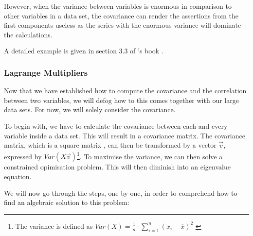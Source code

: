 However, when the variance between variables is enormous in comparison to other variables in a data set, the covariance can render the assertions from the first components useless as the series with the enormous variance will dominate the calculations.

A detailed example is given in section 3.3 of \citeauthor{brunton2019data}'s book  \cite{brunton2019data}.


\clearpage



\subsubsection{Lagrange Multipliers}

Now that we have established how to compute the covariance and the correlation between two variables, we will defog how to this comes together with our large data sets.
For now, we will solely consider the covariance.

To begin with, we have to calculate the covariance between each and every variable inside a data set.
This will result in a covariance matrix.
The covariance matrix, which is a square matrix \cite{PythonMachineLearningCh1}, can then be transformed by a vector $\overrightarrow{v}$, expressed by $Var(X\overrightarrow{v})$\footnote{%
	The variance is defined as $Var(X) = \frac{1}{n} \cdot \displaystyle\sum_{i=1}^{n} (x_i - \overline{x})^2$ \cite{deisenroth2020mathematics}
}.
To maximise the variance, we can then solve a constrained opimisation problem.
This will then diminish into an eigenvalue equation.
\bigskip


We will now go through the steps, one-by-one, in order to comprehend how to find an algebraic solution to this problem:


